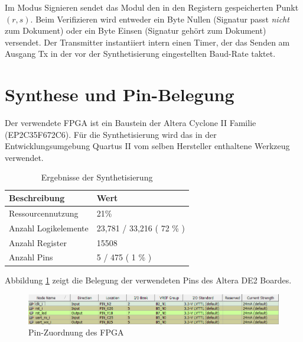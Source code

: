 Im Modus Signieren sendet das Modul den in den Registern gespeicherten Punkt $(r, s)$. Beim Verifizieren wird entweder ein Byte Nullen (Signatur passt \textit{nicht} zum Dokument) oder ein Byte Einsen (Signatur gehört zum Dokument) versendet. Der Transmitter instantiiert intern einen Timer, der das Senden am Ausgang Tx in der vor der Synthetisierung eingestellten Baud-Rate taktet. \\



\section{Synthese und Pin-Belegung}

Der verwendete FPGA ist ein Baustein der Altera Cyclone II Familie (EP2C35F672C6). Für die Synthetisierung wird das in der Entwicklungsumgebung Quartus II vom selben Hersteller enthaltene Werkzeug verwendet. \\

\begin{table} [h]
	\centering 
	\begin{tabular}{ | p{6cm} | p{3cm} | }
		\hline
		\textbf{Beschreibung} & \textbf{Wert}\\
		\hline
		Ressourcennutzung & 21\% \\
		\hline
		Anzahl Logikelemente & 23,781 / 33,216 ( 72 \% ) \\
		\hline
		Anzahl Register & 15508 \\
		\hline
		Anzahl Pins & 5 / 475 ( 1 \% ) \\
		\hline
	\end{tabular}
	\caption{Ergebnisse der Synthetisierung}
	\label{tab:vhdl-impl-de2}
\end{table}

Abbildung \ref{fig:pins} zeigt die Belegung der verwendeten Pins des Altera DE2 Boardes.

\begin{figure}[H]
	\centering
	\includegraphics[width=\textwidth]{bilder/pins}
	\caption{Pin-Zuordnung des FPGA}
	\label{fig:pins}
\end{figure}
